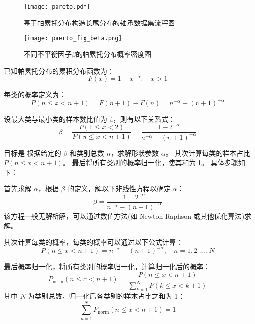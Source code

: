 \documentclass[master]{thesis-uestc}
\begin{document}
\begin{figure}[h]
    \centering
    \texttt{[image: pareto.pdf]}
    \caption{基于帕累托分布构造长尾分布的轴承数据集流程图}
    \label{pareto}
\end{figure}

\begin{figure}[h]
    \centering
    \texttt{[image: paerto\_fig\_beta.png]}
    \caption{不同不平衡因子$\beta$的帕累托分布概率密度图}
    \label{paerto_fig_beta}
\end{figure}

已知帕累托分布的累积分布函数为：
\begin{equation}
F(x) = 1 - x^{-\alpha}, \quad x > 1
\end{equation}

每类的概率定义为：
\begin{equation}
P(n \leq x < n+1) = F(n+1) - F(n) = n^{-\alpha} - (n+1)^{-\alpha}
\end{equation}

设最大类与最小类的样本数比值为 $\beta$，则有以下关系式：
\begin{equation}
\beta = \frac{P(1 \leq x < 2)}{P(n \leq x < n+1)} = \frac{1 - 2^{-\alpha}}{n^{-\alpha} - (n+1)^{-\alpha}}
\end{equation}

目标是
    根据给定的 $\beta$ 和类别总数 $n$，求解形状参数 $\alpha$。
    其次计算每类的样本占比 $P(n \leq x < n+1)$。
    最后将所有类别的概率归一化，使其和为 1。
具体步骤如下：
    
首先求解 $\alpha$，根据 $\beta$ 的定义，解以下非线性方程以确定 $\alpha$：
\begin{equation}
\beta = \frac{1 - 2^{-\alpha}}{n^{-\alpha} - (n+1)^{-\alpha}}
\end{equation}
该方程一般无解析解，可以通过数值方法(如 Newton-Raphson 或其他优化算法)求解。

其次计算每类的概率，每类的概率可以通过以下公式计算：
\begin{equation}
P(n \leq x < n+1) = n^{-\alpha} - (n+1)^{-\alpha}, \quad n = 1, 2, \dots, N
\end{equation}

最后概率归一化，将所有类别的概率归一化，计算归一化后的概率：
\begin{equation}
P_{\text{norm}}(n \leq x < n+1) = \frac{P(n \leq x < n+1)}{\sum_{k=1}^N P(k \leq x < k+1)}
\label{pareto_sample}
\end{equation}
其中 $N$ 为类别总数，归一化后各类别的样本占比之和为 1：
\begin{equation}
\sum_{n=1}^N P_{\text{norm}}(n \leq x < n+1) = 1
\end{equation}
\end{document}

